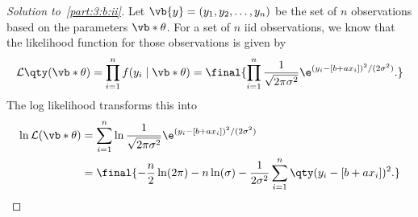\documentclass[10pt, physics]{homework}
\begin{document}
	\begin{proof}[Solution to~\ref{part:3:b:ii}]
		Let $\vb{y} = (y_1,y_2,\dots,y_n)$ be the set of $n$ observations based on the parameters $\vb*{\theta}$.
		For a set of $n$ iid observations, we know that the likelihood function for those observations is given by
		\[ \mathcal{L}\qty(\vb*{\theta}) = \prod_{i = 1}^n f(y_i \mid \vb*{\theta}) = \final{\prod_{i = 1}^n \frac{1}{\sqrt{2\pi\sigma^2}}\e^{(y_i-[b+ax_i])^2/(2\sigma^2)}.}\]
		The log likelihood transforms this into
		\begin{align*}
			\ln\mathcal{L}(\vb*{\theta}) &= \sum_{i = 1}^n \ln \frac{1}{\sqrt{2\pi\sigma^2}}\e^{(y_i-[b+ax_i])^2/(2\sigma^2)} \\
			& = \final{-\frac{n}{2}\ln(2\pi) - n\ln(\sigma) - \frac{1}{2\sigma^2}\sum_{i=1}^n\qty(y_i - [b + ax_i])^2.}\qedhere
		\end{align*}
	\end{proof}
\end{document}
